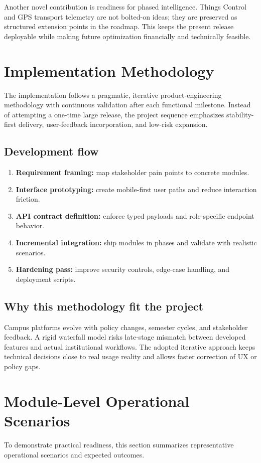 \documentclass[conference]{IEEEtran}
\begin{document}
Another novel contribution is readiness for phased intelligence. Things Control and GPS transport telemetry are not bolted-on ideas; they are preserved as structured extension points in the roadmap. This keeps the present release deployable while making future optimization financially and technically feasible.

\section{Implementation Methodology}
The implementation follows a pragmatic, iterative product-engineering methodology with continuous validation after each functional milestone. Instead of attempting a one-time large release, the project sequence emphasizes stability-first delivery, user-feedback incorporation, and low-risk expansion.

\subsection{Development flow}
\begin{enumerate}
    \item \textbf{Requirement framing:} map stakeholder pain points to concrete modules.
    \item \textbf{Interface prototyping:} create mobile-first user paths and reduce interaction friction.
    \item \textbf{API contract definition:} enforce typed payloads and role-specific endpoint behavior.
    \item \textbf{Incremental integration:} ship modules in phases and validate with realistic scenarios.
    \item \textbf{Hardening pass:} improve security controls, edge-case handling, and deployment scripts.
\end{enumerate}

\subsection{Why this methodology fit the project}
Campus platforms evolve with policy changes, semester cycles, and stakeholder feedback. A rigid waterfall model risks late-stage mismatch between developed features and actual institutional workflows. The adopted iterative approach keeps technical decisions close to real usage reality and allows faster correction of UX or policy gaps.

\section{Module-Level Operational Scenarios}
To demonstrate practical readiness, this section summarizes representative operational scenarios and expected outcomes.
\end{document}
